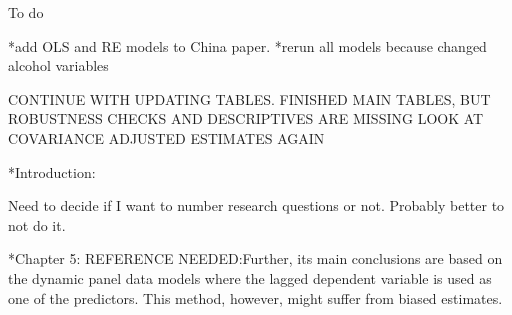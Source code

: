 To do

*add OLS and RE models to China paper.
*rerun all models because changed alcohol variables


CONTINUE WITH UPDATING TABLES. FINISHED MAIN TABLES, BUT ROBUSTNESS CHECKS AND DESCRIPTIVES ARE MISSING
LOOK AT COVARIANCE ADJUSTED ESTIMATES AGAIN

*Introduction:

Need to decide if I want to number research questions or not. Probably better to not do it.

*Chapter 5:  REFERENCE NEEDED:Further, its main conclusions are based on the dynamic panel data models where the lagged dependent variable is used as one of the predictors. This method, however, might suffer from biased estimates.
